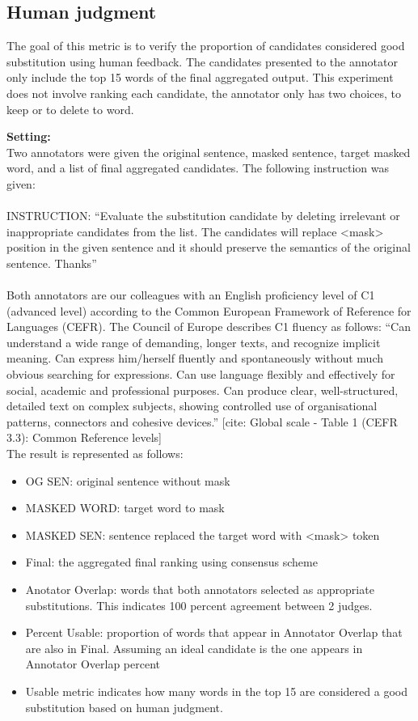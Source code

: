 \documentclass[12pt,oneside,openright,a4paper]{cpe-english-project}
\begin{document}
\subsection{Human judgment}

The goal of this metric is to verify the proportion of candidates considered good substitution using human feedback. The candidates presented to the annotator only include the top 15 words of the final aggregated output. This experiment does not involve ranking each candidate, the annotator only has two choices, to keep or to delete to word.

\textbf{Setting:}\\
Two annotators were given the original sentence, masked sentence, target masked word, and a list of final aggregated candidates. The following instruction was given:
\\\\
INSTRUCTION:
“Evaluate the substitution candidate by deleting irrelevant or inappropriate candidates from the list.
The candidates will replace <mask> position in the given sentence and it should preserve the semantics of the original sentence. Thanks”
\\\\
Both annotators are our colleagues with an English proficiency level of C1 (advanced level) according to the Common European Framework of Reference for Languages (CEFR). 
The Council of Europe describes C1 fluency as follows:
“Can understand a wide range of demanding, longer texts, and recognize implicit meaning. Can express him/herself fluently and spontaneously without much obvious searching for expressions. Can use language flexibly and effectively for social, academic and professional purposes. Can produce clear, well-structured, detailed text on complex subjects, showing controlled use of organisational patterns, connectors and cohesive devices.” [cite: Global scale - Table 1 (CEFR 3.3): Common Reference levels]
\\
The result is represented as follows:
\begin{itemize}

\item OG SEN: original sentence without mask
\item MASKED WORD: target word to mask
\item MASKED SEN: sentence replaced the target word with <mask> token


\item Final: the aggregated final ranking using consensus scheme
\item Anotator Overlap: words that both annotators selected as appropriate substitutions. This indicates 100 percent agreement between 2 judges.
\item Percent Usable: proportion of words that appear in Annotator Overlap that are also in Final. Assuming an ideal candidate is the one appears in Annotator Overlap percent 
\item Usable metric indicates how many words in the top 15 are considered a good substitution based on human judgment. 
\end{itemize}
\end{document}
